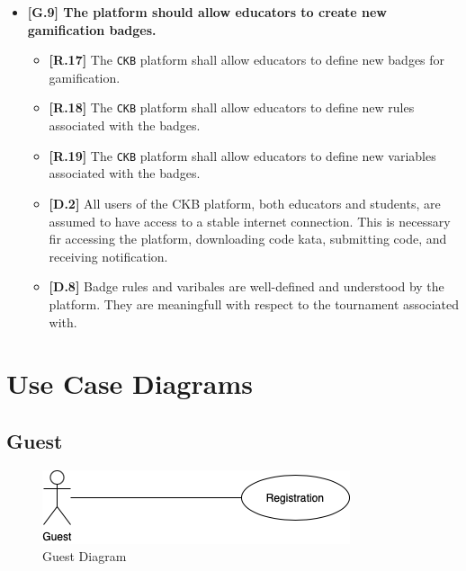 \begin{itemize}
        \item \textbf{{[G.9]} The platform should allow educators to create new gamification badges.}
        \begin{itemize}
            \item \textbf{[R.17]} The \verb|CKB| platform shall allow educators to define new badges for gamification. 
            \item \textbf{[R.18]} The \verb|CKB| platform shall allow educators to define new rules associated with the badges.
            \item \textbf{[R.19]} The \verb|CKB| platform shall allow educators to define new variables associated with the badges.
            \item \textbf{[D.2]} All users of the CKB platform, both educators and students, are assumed to have access to a stable internet connection. This is
            necessary fir accessing the platform, downloading code kata, submitting code, and receiving notification.
            \item \textbf{[D.8]} Badge rules and varibales are well-defined and understood by the platform. They are meaningfull with respect to the tournament associated with.
        \end{itemize}
    \end{itemize}
\section{Use Case Diagrams}
\label{subsec:use_cases}
\subsection{Guest}
\label{subsec: use_case_diagrams}%
\begin{figure}[H]
    \begin{center}
        \includegraphics[width=0.6\linewidth]{Images/UCD_Registration.png}
        \caption{Guest Diagram}
        \label{fig:guest_uc_diagram}%
    \end{center}
\end{figure}

